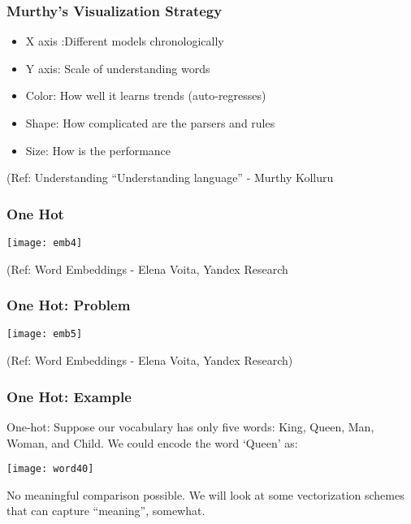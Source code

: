\begin{frame}[fragile]\frametitle{Murthy's Visualization Strategy}
\begin{itemize}
\item X axis :Different models chronologically
\item Y axis: Scale of understanding words
\item Color: How well it learns trends (auto-regresses)
\item Shape:  How complicated are the parsers and rules
\item Size:  How is the performance
\end{itemize}

{\tiny (Ref: Understanding ``Understanding language'' - Murthy Kolluru}

\end{frame}



\begin{frame}[fragile]\frametitle{One Hot}
\begin{center}
\texttt{[image: emb4]}
\end{center}

{\tiny (Ref: Word Embeddings - Elena Voita, Yandex Research}
\end{frame}


\begin{frame}[fragile]\frametitle{One Hot: Problem}
\begin{center}
\texttt{[image: emb5]}
\end{center}

{\tiny (Ref: Word Embeddings - Elena Voita, Yandex Research)}
\end{frame}

\begin{frame}[fragile]\frametitle{One Hot: Example}
One-hot:  Suppose our vocabulary has only five words: King, Queen, Man, Woman, and Child. We could encode the word `Queen' as:
\begin{center}
\texttt{[image: word40]}
\end{center}
No meaningful comparison possible. We will look at some vectorization schemes that can capture ``meaning'', somewhat.
\end{frame}

